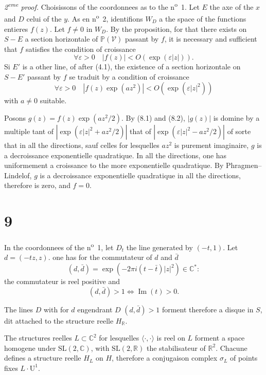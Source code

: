 \documentclass[12pt,a4paper]{article}
\theoremstyle{plain}
\theoremstyle{definition}
\theoremstyle{remark}
\DeclareMathOperator{\Impart}{Im}
\begin{document}
\medskip
\noindent\textit{2\textsuperscript{eme} proof.} Choisissons of the coordonnees as to the n\textsuperscript{o}~1. Let $E$ the axe of the $x$ and $D$ celui of the $y$. As en n\textsuperscript{o}~2, identifions $W_D$ a the space of the functions entieres $f(z)$. Let $f \neq 0$ in $W_D$. By the proposition, for that there exists on $S - E$ a section horizontale of $\mathbb{P}(\mathscr{V})$ passant by $f$, it is necessary and sufficient that $f$ satisfies the condition of croissance
\begin{equation}\label{eq:8.1}
\forall \varepsilon > 0 \quad |f(z)| < O(\exp(\varepsilon|z|)).\tag{8.1}
\end{equation}
Si $E'$ is a other line, of after (4.1), the existence of a section horizontale on $S - E'$ passant by $f$ se traduit by a condition of croissance
\begin{equation}\label{eq:8.2}
\forall \varepsilon > 0 \quad |f(z)\exp(az^2)| < O(\exp(\varepsilon|z|^2))\tag{8.2}
\end{equation}
with $a \neq 0$ suitable.

Posons $g(z) = f(z)\exp(az^2/2)$. By (8.1) and (8.2), $|g(z)|$ is domine by a multiple tant of $|\exp(\varepsilon|z|^2 + az^2/2)|$ that of $|\exp(\varepsilon|z|^2 - az^2/2)|$ of sorte that in all the directions, sauf celles for lesquelles $az^2$ is purement imaginaire, $g$ is a decroissance exponentielle quadratique. In all the directions, one has uniformement a croissance to the more exponentielle quadratique. By Phragmen--Lindelof, $g$ is a decroissance exponentielle quadratique in all the directions, therefore is zero, and $f = 0$.

\section*{9}

In the coordonnees of the n\textsuperscript{o}~1, let $D_t$ the line generated by $(-t, 1)$. Let $d = (-tz, z)$. one has for the commutateur of $d$ and $\bar{d}$
\[(d, \bar{d}) = \exp(-2\pi i(t - \bar{t})|z|^2) \in \mathbb{C}^*:\]
the commutateur is reel positive and
\[(d, \bar{d}) > 1 \iff \Impart(t) > 0.\]

The lines $D$ with for $d$ engendrant $D$ $(d, \bar{d}) > 1$ forment therefore a disque in $S$, dit attached to the structure reelle $H_\mathbb{R}$.

The structures reelles $L \subset \mathbb{C}^2$ for lesquelles $\langle \cdot, \cdot \rangle$ is reel on $L$ forment a space homogene under $\mathrm{SL}(2, \mathbb{C})$, with $\mathrm{SL}(2, \mathbb{R})$ the stabilisateur of $\mathbb{R}^2$. Chacune defines a structure reelle $H_L$ on $H$, therefore a conjugaison complex $\sigma_L$ of points fixes $L \cdot \mathrm{U}^1$.
\end{document}
